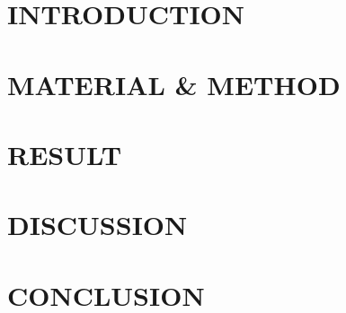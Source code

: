 \documentclass{aes2e}
\begin{document}
\section*{INTRODUCTION}


\setcounter{section}{0}
\section{MATERIAL \& METHOD}


\section{RESULT}


\section{DISCUSSION}


\section{CONCLUSION}

\end{document}
